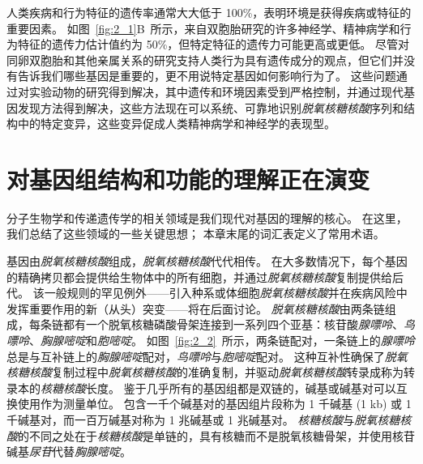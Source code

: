 人类疾病和行为特征的遗传率通常大大低于 100\%，表明环境是获得疾病或特征的重要因素。
如图~\ref{fig:2_1}B~所示，来自双胞胎研究的许多神经学、精神病学和行为特征的遗传力估计值约为 50\%，但特定特征的遗传力可能更高或更低。
尽管对同卵双胞胎和其他亲属关系的研究支持人类行为具有遗传成分的观点，但它们并没有告诉我们哪些基因是重要的，更不用说特定基因如何影响行为了。
这些问题通过对实验动物的研究得到解决，其中遗传和环境因素受到严格控制，并通过现代基因发现方法得到解决，这些方法现在可以系统、可靠地识别\textit{脱氧核糖核酸}序列和结构中的特定变异，这些变异促成人类精神病学和神经学的表现型。



\section{对基因组结构和功能的理解正在演变}

分子生物学和传递遗传学的相关领域是我们现代对基因的理解的核心。
在这里，我们总结了这些领域的一些关键思想；
本章末尾的词汇表定义了常用术语。


基因由\textit{脱氧核糖核酸}组成，\textit{脱氧核糖核酸}代代相传。
在大多数情况下，每个基因的精确拷贝都会提供给生物体中的所有细胞，并通过\textit{脱氧核糖核酸}复制提供给后代。
该一般规则的罕见例外——引入种系或体细胞\textit{脱氧核糖核酸}并在疾病风险中发挥重要作用的新（从头）突变——将在后面讨论。
\textit{脱氧核糖核酸}由两条链组成，每条链都有一个脱氧核糖磷酸骨架连接到一系列四个亚基：核苷酸\textit{腺嘌呤}、\textit{鸟嘌呤}、\textit{胸腺嘧啶}和\textit{胞嘧啶}。
如图~\ref{fig:2_2}~所示，两条链配对，一条链上的\textit{腺嘌呤}总是与互补链上的\textit{胸腺嘧啶}配对，\textit{鸟嘌呤}与\textit{胞嘧啶}配对。
这种互补性确保了\textit{脱氧核糖核酸}复制过程中\textit{脱氧核糖核酸}的准确复制，并驱动\textit{脱氧核糖核酸}转录成称为转录本的\textit{核糖核酸}长度。
鉴于几乎所有的基因组都是双链的，碱基或碱基对可以互换使用作为测量单位。
包含一千个碱基对的基因组片段称为 1 千碱基 (1 kb) 或 1 千碱基对，而一百万碱基对称为 1 兆碱基或 1 兆碱基对。
\textit{核糖核酸}与\textit{脱氧核糖核酸}的不同之处在于\textit{核糖核酸}是单链的，具有核糖而不是脱氧核糖骨架，并使用核苷碱基\textit{尿苷}代替\textit{胸腺嘧啶}。


